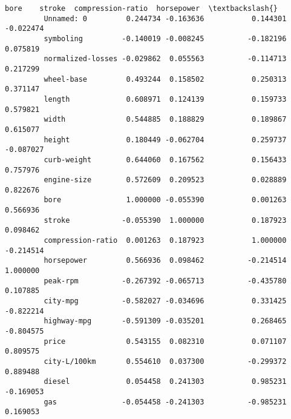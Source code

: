 \documentclass[11pt]{article}
\begin{document}
\begin{Verbatim}[commandchars=\\\{\}]
                                bore    stroke  compression-ratio  horsepower  \textbackslash{}
         Unnamed: 0         0.244734 -0.163636           0.144301   -0.022474   
         symboling         -0.140019 -0.008245          -0.182196    0.075819   
         normalized-losses -0.029862  0.055563          -0.114713    0.217299   
         wheel-base         0.493244  0.158502           0.250313    0.371147   
         length             0.608971  0.124139           0.159733    0.579821   
         width              0.544885  0.188829           0.189867    0.615077   
         height             0.180449 -0.062704           0.259737   -0.087027   
         curb-weight        0.644060  0.167562           0.156433    0.757976   
         engine-size        0.572609  0.209523           0.028889    0.822676   
         bore               1.000000 -0.055390           0.001263    0.566936   
         stroke            -0.055390  1.000000           0.187923    0.098462   
         compression-ratio  0.001263  0.187923           1.000000   -0.214514   
         horsepower         0.566936  0.098462          -0.214514    1.000000   
         peak-rpm          -0.267392 -0.065713          -0.435780    0.107885   
         city-mpg          -0.582027 -0.034696           0.331425   -0.822214   
         highway-mpg       -0.591309 -0.035201           0.268465   -0.804575   
         price              0.543155  0.082310           0.071107    0.809575   
         city-L/100km       0.554610  0.037300          -0.299372    0.889488   
         diesel             0.054458  0.241303           0.985231   -0.169053   
         gas               -0.054458 -0.241303          -0.985231    0.169053   
         

\end{Verbatim}
\end{document}
